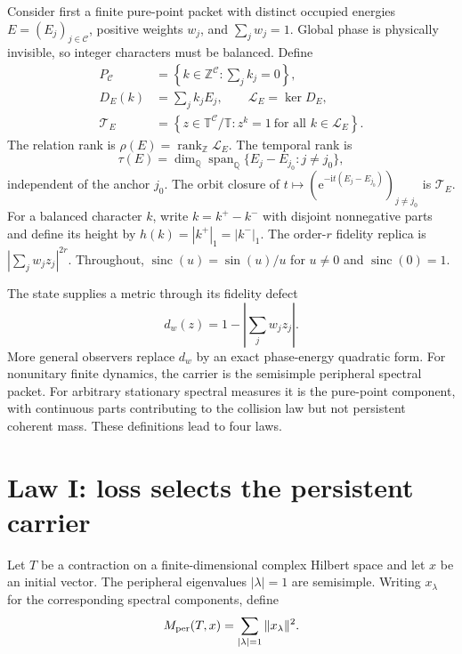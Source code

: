 \documentclass[10pt]{article}
\theoremstyle{definition}
\newcommand{\Z}{\mathbb Z}
\newcommand{\Q}{\mathbb Q}
\newcommand{\T}{\mathbb T}
\newcommand{\ee}{\mathrm e}
\newcommand{\ii}{\mathrm i}
\newcommand{\rank}{\operatorname{rank}}
\newcommand{\Rel}{\mathcal L}
\newcommand{\Hull}{\mathcal T}
\newcommand{\Carrier}{\mathcal C}
\newcommand{\sinc}{\operatorname{sinc}}
\begin{document}
Consider first a finite pure-point packet with distinct occupied energies
$E=(E_j)_{j\in\Carrier}$, positive weights $w_j$, and
$\sum_jw_j=1$.  Global phase is physically invisible, so integer
characters must be balanced.  Define
\begin{align}
 P_{\Carrier}&=\left\{k\in\Z^{\Carrier}:\sum_jk_j=0\right\},
 \label{eq:projectivecharacters}\\
 D_E(k)&=\sum_j k_jE_j,\qquad
 \Rel_E=\ker D_E,                                      \label{eq:detuning}\\
 \Hull_E&=\left\{z\in\T^{\Carrier}/\T:
             z^k=1\ \text{for all }k\in\Rel_E\right\}. \label{eq:hull}
\end{align}
The relation rank is $\rho(E)=\rank_{\Z}\Rel_E$.  The temporal rank is
\begin{equation}
 \tau(E)=\dim_{\Q}\operatorname{span}_{\Q}
       \{E_j-E_{j_0}:j\ne j_0\},                       \label{eq:tau}
\end{equation}
independent of the anchor $j_0$.  The orbit closure of
$t\mapsto(\ee^{-\ii t(E_j-E_{j_0})})_{j\ne j_0}$ is $\Hull_E$.
For a balanced character $k$, write $k=k^+-k^-$ with disjoint
nonnegative parts and define its height by
$h(k)=|k^+|_1=|k^-|_1$.  The order-$r$ fidelity replica is
$|\sum_jw_jz_j|^{2r}$.  Throughout,
$\sinc(u)=\sin(u)/u$ for $u\ne0$ and $\sinc(0)=1$.

The state supplies a metric through its fidelity defect
\begin{equation}
 d_w(z)=1-\left|\sum_jw_jz_j\right|.                    \label{eq:metric}
\end{equation}
More general observers replace $d_w$ by an exact phase-energy quadratic
form.  For nonunitary finite dynamics, the carrier is the semisimple
peripheral spectral packet.  For arbitrary stationary spectral measures it
is the pure-point component, with continuous parts contributing to the
collision law but not persistent coherent mass.  These definitions lead to
four laws.

\section{Law I: loss selects the persistent carrier}

Let $T$ be a contraction on a finite-dimensional complex Hilbert space and
let $x$ be an initial vector.  The peripheral eigenvalues
$|\lambda|=1$ are semisimple.  Writing $x_{\lambda}$ for the corresponding
spectral components, define
\begin{equation}
 M_{\rm per}(T,x)=\sum_{|\lambda|=1}\|x_{\lambda}\|^2. \label{eq:peripheral}
\end{equation}
\end{document}
